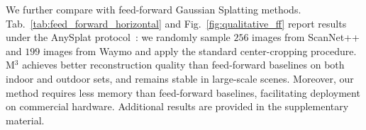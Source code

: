 We further compare with feed-forward Gaussian Splatting methods. 
Tab.~\ref{tab:feed_forward_horizontal} and Fig.~\ref{fig:qualitative_ff} report results under the AnySplat protocol~\cite{jiang2025anysplat}: we randomly sample $256$ images from ScanNet++ and $199$ images from Waymo and apply the standard center-cropping procedure. 
M$^3$ achieves better reconstruction quality than feed-forward baselines on both indoor and outdoor sets, and remains stable in large-scale scenes. Moreover, our method requires less memory than feed-forward baselines, facilitating deployment on commercial hardware. Additional results are provided in the supplementary material.




